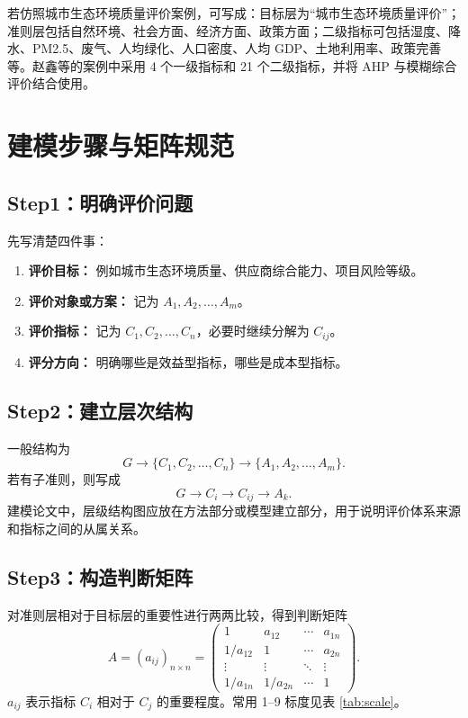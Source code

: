 \documentclass[UTF8,zihao=-4,fontset=none]{ctexart}
\begin{document}
若仿照城市生态环境质量评价案例，可写成：目标层为“城市生态环境质量评价”；准则层包括自然环境、社会方面、经济方面、政策方面；二级指标可包括湿度、降水、PM2.5、废气、人均绿化、人口密度、人均 GDP、土地利用率、政策完善等。赵鑫等的案例中采用 4 个一级指标和 21 个二级指标，并将 AHP 与模糊综合评价结合使用。

\section{建模步骤与矩阵规范}
\subsection{Step1：明确评价问题}
先写清楚四件事：
\begin{enumerate}[leftmargin=2.2em]
  \item \textbf{评价目标：} 例如城市生态环境质量、供应商综合能力、项目风险等级。
  \item \textbf{评价对象或方案：} 记为 $A_1,A_2,\ldots,A_m$。
  \item \textbf{评价指标：} 记为 $C_1,C_2,\ldots,C_n$，必要时继续分解为 $C_{ij}$。
  \item \textbf{评分方向：} 明确哪些是效益型指标，哪些是成本型指标。
\end{enumerate}

\subsection{Step2：建立层次结构}
一般结构为
\begin{equation}
  G \longrightarrow \{C_1,C_2,\ldots,C_n\} \longrightarrow \{A_1,A_2,\ldots,A_m\}.
\end{equation}
若有子准则，则写成
\begin{equation}
  G \longrightarrow C_i \longrightarrow C_{ij} \longrightarrow A_k .
\end{equation}
建模论文中，层级结构图应放在方法部分或模型建立部分，用于说明评价体系来源和指标之间的从属关系。

\subsection{Step3：构造判断矩阵}
对准则层相对于目标层的重要性进行两两比较，得到判断矩阵
\begin{equation}
A=(a_{ij})_{n\times n}=\begin{pmatrix}
1 & a_{12} & \cdots & a_{1n}\\
1/a_{12} & 1 & \cdots & a_{2n}\\
\vdots & \vdots & \ddots & \vdots\\
1/a_{1n} & 1/a_{2n} & \cdots & 1
\end{pmatrix}.
\end{equation}
$a_{ij}$ 表示指标 $C_i$ 相对于 $C_j$ 的重要程度。常用 1--9 标度见表 \ref{tab:scale}。
\end{document}
